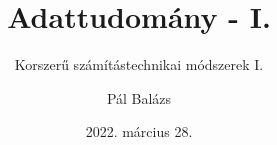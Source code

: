 \title[Adattudomány - I.]
{Adattudomány - I.}
\subtitle{Korszerű számítástechnikai módszerek I.}

\author[Pál Balázs]
{Pál Balázs}


\date[2022. március 28.]
{2022. március 28.}